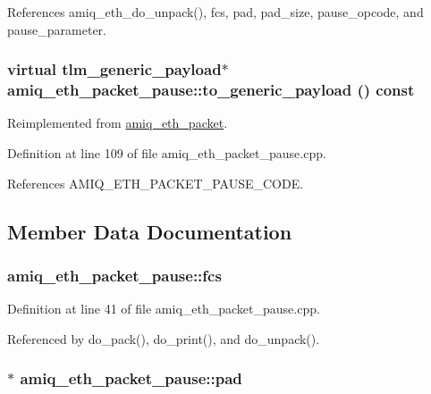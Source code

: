 References amiq\_\-eth\_\-do\_\-unpack(), fcs, pad, pad\_\-size, pause\_\-opcode, and pause\_\-parameter.\hypertarget{classamiq__eth__packet__pause_ab59bd7087700e15e79018f72d809d76a}{
\subsubsection[{to\_\-generic\_\-payload}]{\setlength{\rightskip}{0pt plus 5cm}virtual tlm\_\-generic\_\-payload$\ast$ amiq\_\-eth\_\-packet\_\-pause::to\_\-generic\_\-payload () const}}
\label{classamiq__eth__packet__pause_ab59bd7087700e15e79018f72d809d76a}


Reimplemented from \hyperlink{classamiq__eth__packet_a6dd92751d8172eeaa347d71bb415b0d5}{amiq\_\-eth\_\-packet}.

Definition at line 109 of file amiq\_\-eth\_\-packet\_\-pause.cpp.

References AMIQ\_\-ETH\_\-PACKET\_\-PAUSE\_\-CODE.

\subsection{Member Data Documentation}
\hypertarget{classamiq__eth__packet__pause_a2ea030b909dafbd1470053eb13960eaa}{
\subsubsection[{fcs}]{ {\bf amiq\_\-eth\_\-packet\_\-pause::fcs}}}
\label{classamiq__eth__packet__pause_a2ea030b909dafbd1470053eb13960eaa}


Definition at line 41 of file amiq\_\-eth\_\-packet\_\-pause.cpp.

Referenced by do\_\-pack(), do\_\-print(), and do\_\-unpack().\hypertarget{classamiq__eth__packet__pause_a23b5341742ff52a6144b1088cfe86ff8}{
\subsubsection[{pad}]{$\ast$ {\bf amiq\_\-eth\_\-packet\_\-pause::pad}}}
\label{classamiq__eth__packet__pause_a23b5341742ff52a6144b1088cfe86ff8}


